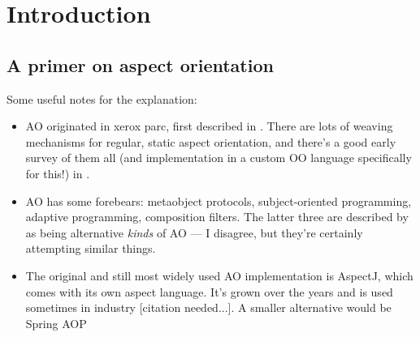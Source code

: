 \chapter{Introduction}



\section{A primer on aspect orientation}

 Some useful notes for the
explanation:

\begin{itemize}
    \item AO originated in xerox parc, first described in
    \cite{kiczales1997aspect}. There are lots of weaving mechanisms for regular,
    static aspect orientation, and there's a good early survey of them all (and
    implementation in a custom OO language specifically for this!) in
    \cite{masuhara2003modeling}.
    \item AO has some forebears: metaobject protocols, subject-oriented
    programming, adaptive programming, composition filters. The latter three are
    described by \cite{chibani2019using} as being alternative \emph{kinds} of AO
    --- I disagree, but they're certainly attempting similar things.
    \item The original and still most widely used AO implementation is AspectJ,
    which comes with its own aspect language. It's grown over the years and is
    used sometimes in industry [citation needed...]. A smaller alternative would
    be Spring AOP
\end{itemize}










